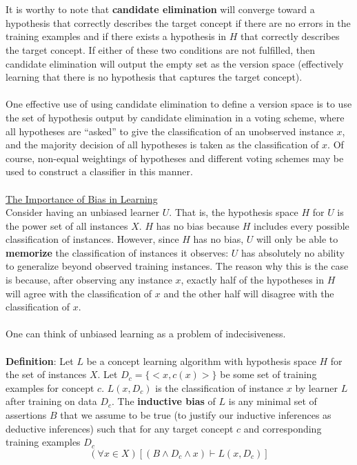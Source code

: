 \documentclass[11pt]{article}
\begin{document}
\\
\\
It is worthy to note that \textbf{candidate elimination} will converge toward a hypothesis that correctly describes the target concept if there are no errors in the training examples and if there exists a hypothesis in $H$ that correctly describes the target concept. If either of these two conditions are not fulfilled, then candidate elimination will output the empty set as the version space (effectively learning that there is no hypothesis that captures the target concept).
\\
\\
One effective use of using candidate elimination to define a version space is to use the set of hypothesis output by candidate elimination in a voting scheme, where all hypotheses are ``asked'' to give the classification of an unobserved instance $x$, and the majority decision of all hypotheses is taken as the classification of $x$. Of course, non-equal weightings of hypotheses and different voting schemes may be used to construct a classifier in this manner.
\\
\\
\underline{The Importance of Bias in Learning}\\
Consider having an unbiased learner $U$. That is, the hypothesis space $H$ for $U$ is the power set of all instances $X$. $H$ has no bias because $H$ includes every possible classification of instances. However, since $H$ has no bias, $U$ will only be able to \textbf{memorize} the classification of instances it observes: $U$ has absolutely no ability to generalize beyond observed training instances. The reason why this is the case is because, after observing any instance $x$, exactly half of the hypotheses in $H$ will agree with the classification of $x$ and the other half will disagree with the classification of $x$.
\\
\\
One can think of unbiased learning as a problem of indecisiveness.
\\
\\
\textbf{Definition}: Let $L$ be a concept learning algorithm with hypothesis space $H$ for the set of instances $X$. Let $D_c = \{ <x,c(x)>\}$ be some set of training examples for concept $c$. $L(x, D_c)$ is the classification of instance $x$ by learner $L$ after training on data $D_c$. The \textbf{inductive bias} of $L$ is any minimal set of assertions $B$ that we assume to be true (to justify our inductive inferences as deductive inferences) such that for any target concept $c$ and corresponding training examples $D_c$ $$(\forall x \in X)[(B \wedge D_c \wedge x) \vdash L(x,D_c)]$$
\end{document}

